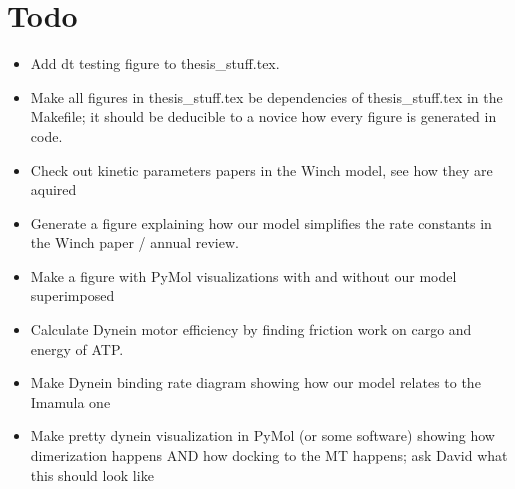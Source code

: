 \documentclass[10pt]{article} %
\begin{document}
\section{Todo}
\begin{itemize}
\item Add dt testing figure to thesis\_stuff.tex.
\item Make all figures in thesis\_stuff.tex be dependencies of thesis\_stuff.tex in the Makefile; it should be deducible to a novice how every figure is generated in code.
\item Check out kinetic parameters papers in the Winch model, see how they are aquired
\item Generate a figure explaining how our model simplifies the rate constants in the Winch paper / annual review.
\item Make a figure with PyMol visualizations with and without our model superimposed
\item Calculate Dynein motor efficiency by finding friction work on cargo and energy of ATP.
\item Make Dynein binding rate diagram showing how our model relates to the Imamula one
\item Make pretty dynein visualization in PyMol (or some software) showing how dimerization happens AND how docking to the MT happens; ask David what this should look like
\end{itemize}



\end{document}
